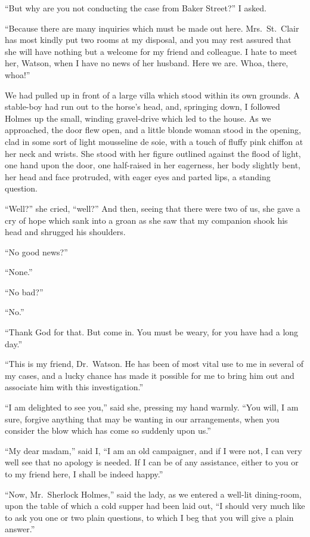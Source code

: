 “But why are you not conducting the case from Baker
Street?” I asked.

“Because there are many inquiries which must be made
out here. Mrs.~St.~Clair has most kindly put two rooms at
my disposal, and you may rest assured that she will have
nothing but a welcome for my friend and colleague. I hate
to meet her, Watson, when I have no news of her husband.
Here we are. Whoa, there, whoa!”

We had pulled up in front of a large villa which stood
within its own grounds. A stable-boy had run out to the horse’s
head, and, springing down, I followed Holmes up the small,
winding gravel-drive which led to the house. As we approached,
the door flew open, and a little blonde woman stood
in the opening, clad in some sort of light mousseline de soie,
with a touch of fluffy pink chiffon at her neck and wrists.
She stood with her figure outlined against the flood of
light, one hand upon the door, one half-raised in her
eagerness, her body slightly bent, her head and face protruded,
with eager eyes and parted lips, a standing
question.

“Well?” she cried, “well?” And then, seeing that there
were two of us, she gave a cry of hope which sank into a
groan as she saw that my companion shook his head and
shrugged his shoulders.

“No good news?”

“None.”

“No bad?”

“No.”

“Thank God for that. But come in. You must be weary,
for you have had a long day.”

“This is my friend, Dr.\ Watson. He has been of most
vital use to me in several of my cases, and a lucky chance
has made it possible for me to bring him out and associate
him with this investigation.”

“I am delighted to see you,” said she, pressing my hand
warmly. “You will, I am sure, forgive anything that may be
wanting in our arrangements, when you consider the blow
which has come so suddenly upon us.”

“My dear madam,” said I, “I am an old campaigner, and
if I were not, I can very well see that no apology is needed.
If I can be of any assistance, either to you or to my friend
here, I shall be indeed happy.”

“Now, Mr.~Sherlock Holmes,” said the lady, as we entered
a well-lit dining-room, upon the table of which a cold supper
had been laid out, “I should very much like to ask you one
or two plain questions, to which I beg that you will give a
plain answer.”


